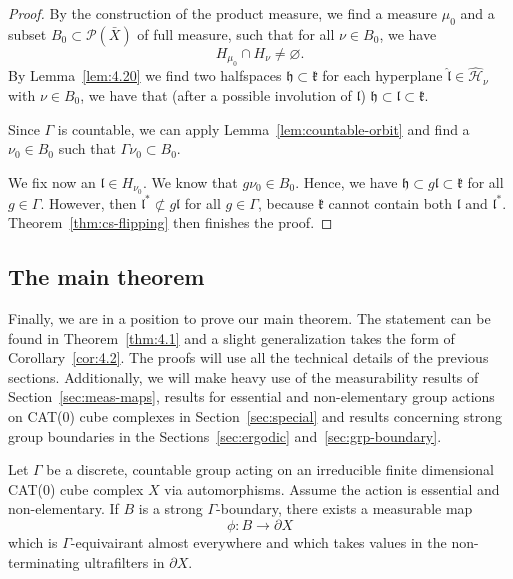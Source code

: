 \begin{proof}
  By the construction of the product measure, we find a measure \(\mu_0\) and a subset \(B_0 \subset \mathcal{P}(\bar X)\) of full measure, such that for all \(\nu \in B_0\), we have
  \[
    H_{\mu_0} \cap H_\nu \neq \varnothing.
  \]
  By Lemma~\ref{lem:4.20} we find two halfspaces \(\mathfrak{h} \subset \mathfrak{k}\) for each hyperplane \(\mathfrak{\hat l} \in \mathcal{\hat H}_\nu\) with \(\nu \in B_0\), we have that (after a possible involution of \(\mathfrak{l}\)) \(\mathfrak{h} \subset \mathfrak{l} \subset \mathfrak{k}\).

  Since \(\Gamma\) is countable, we can apply Lemma~\ref{lem:countable-orbit} and find a \(\nu_0 \in B_0\) such that \(\Gamma \nu_0 \subset B_0\). 

  We fix now an \(\mathfrak{l} \in H_{\nu_0}\). We know that \(g\nu_0 \in B_0\). Hence, we have \(\mathfrak{h} \subset g\mathfrak{l} \subset \mathfrak{k}\) for all \(g \in \Gamma\). However, then \(\mathfrak{l}^\ast \not \subset g\mathfrak{l}\) for all \(g \in \Gamma\), because \(\mathfrak{k}\) cannot contain both \(\mathfrak{l}\) and \(\mathfrak{l}^\ast\). Theorem~\ref{thm:cs-flipping} then finishes the proof.
\end{proof}
  
\subsection{The main theorem}
\label{sec:main-proof}

Finally, we are in a position to prove our main theorem. The statement can be found in Theorem~\ref{thm:4.1} and a slight generalization takes the form of Corollary~\ref{cor:4.2}. The proofs will use all the technical details of the previous sections. Additionally, we will make heavy use of the measurability results of Section~\ref{sec:meas-maps}, results for essential and non-elementary group actions on CAT(0) cube complexes in Section~\ref{sec:special} and results concerning strong group boundaries in the Sections~\ref{sec:ergodic} and~\ref{sec:grp-boundary}.

\begin{thm}[{\cite[Theorem~4.1]{MR3509968}}]
  \label{thm:4.1}
  Let \(\Gamma\) be a discrete, countable group acting on an irreducible finite dimensional CAT(0) cube complex \(X\) via automorphisms. Assume the action is essential and non-elementary. If \(B\) is a strong \(\Gamma\)-boundary, there exists a measurable map
  \[
    \phi\colon B \to \partial X
  \]
  which is \(\Gamma\)-equivairant almost everywhere and which takes values in the non-terminating ultrafilters in \(\partial X\).
\end{thm}

